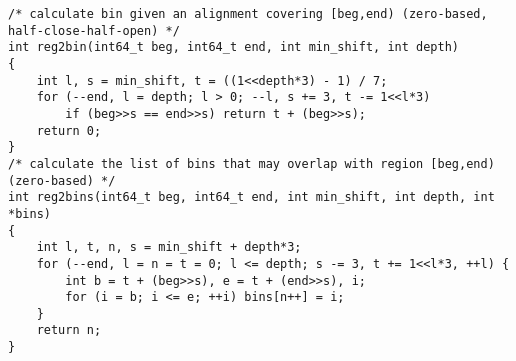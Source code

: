 \documentclass[10pt]{article}
\begin{document}
{\footnotesize
\begin{verbatim}
/* calculate bin given an alignment covering [beg,end) (zero-based, half-close-half-open) */
int reg2bin(int64_t beg, int64_t end, int min_shift, int depth)
{
    int l, s = min_shift, t = ((1<<depth*3) - 1) / 7;
    for (--end, l = depth; l > 0; --l, s += 3, t -= 1<<l*3)
        if (beg>>s == end>>s) return t + (beg>>s);
    return 0;
}
/* calculate the list of bins that may overlap with region [beg,end) (zero-based) */
int reg2bins(int64_t beg, int64_t end, int min_shift, int depth, int *bins)
{
    int l, t, n, s = min_shift + depth*3;
    for (--end, l = n = t = 0; l <= depth; s -= 3, t += 1<<l*3, ++l) {
        int b = t + (beg>>s), e = t + (end>>s), i;
        for (i = b; i <= e; ++i) bins[n++] = i;
    }
    return n;
}
\end{verbatim}
}
\end{document}
